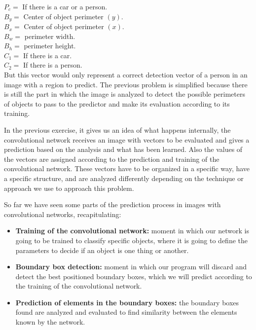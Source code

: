 \( P_{c} = \) If there is a car or a person.\\
\( B_{y} = \) Center of object perimeter \((y)\).\\
\( B_{x} = \) Center of object perimeter \((x)\).\\
\( B_{w} = \) perimeter width.\\
\( B_{h} = \) perimeter height.\\
\( C_{1} = \) If there is a car.\\
\( C_{2} = \) If there is a person.\\

But this vector would only represent a correct detection vector of a person in
an image with a region to predict. The previous problem is simplified because
there is still the part in which the image is analyzed to detect the possible
perimeters of objects to pass to the predictor and make its evaluation according
to its training.

In the previous exercise, it gives us an idea of what happens internally, the
convolutional network receives an image with vectors to be evaluated and gives
a prediction based on the analysis and what has been learned. Also the values of
the vectors are assigned according to the prediction and training of the
convolutional network. These vectors have to be organized in a specific way,
have a specific structure, and are analyzed differently depending on the
technique or approach we use to approach this problem.

So far we have seen some parts of the prediction process in images with
convolutional networks, recapitulating:

\begin{itemize}
    \item \textbf{Training of the convolutional network:} moment in which our
          network is going to be trained to classify specific objects, where it is
          going to define the parameters to decide if an object is one thing or
          another.
    \item \textbf{Boundary box detection:} moment in which our program will
          discard and detect the best positioned boundary boxes, which we will predict
          according to the training of the convolutional network.
    \item \textbf{Prediction of elements in the boundary boxes:} the boundary
          boxes found are analyzed and evaluated to find similarity between the
          elements known by the network.
\end{itemize}

